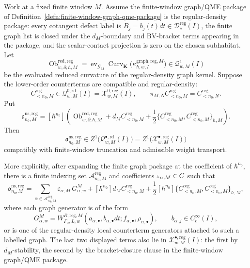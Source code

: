 \begin{prop}
\label{prop:wt-regular-density-curvature-certificate}
  Work at a fixed finite window \(M\).  Assume the finite-window
  graph/QME package of
  Definition~\ref{defn:finite-window-graph-qme-package} is the
  regular-density package: every cotangent defect label is
  \(B_j=b_j(t)dt\in\mathcal D^{\mathrm{reg}}_c(I)\), the finite graph list
  is closed under the \(d_M\)-boundary and BV-bracket terms appearing in
  the package, and the scalar-contact projection is zero on the chosen
  subhabitat.  Let
  \[
    \operatorname{Ob}^{\mathrm{red,reg}}_{w,\partial,\hbar,M}
      =
    \operatorname{ev}_{\mathcal G_M}
      \operatorname{Curv}_{\mathbf K}
      \bigl(\kappa^{\mathrm{graph,reg},M}_{\hbar,w,I}\bigr)
      \in
    \mathcal Q^1_{w,M}(I)
  \]
  be the evaluated reduced curvature of the regular-density graph kernel.
  Suppose the lower-order counterterms are compatible and regular-density:
  \[
    C^{\mathrm{reg}}_{<n_0,M}
      \in
    \mathcal Q^{0,\mathrm{rd}}_{w,M}(I)
      =
    \mathcal X^{0,\mathrm{reg}}_{w,M}(I),
    \qquad
    \pi_{M,N}C^{\mathrm{reg}}_{<n_0,M}
      =
    C^{\mathrm{reg}}_{<n_0,N}.
  \]
  Put
  \[
    \mathfrak o^{\mathrm{ns,reg}}_{n_0,M}
      =
      [\hbar^{n_0}]\left(
        \operatorname{Ob}^{\mathrm{red,reg}}_{w,\partial,\hbar,M}
        +d_MC^{\mathrm{reg}}_{<n_0,M}
        +\frac12
          \{C^{\mathrm{reg}}_{<n_0,M},
            C^{\mathrm{reg}}_{<n_0,M}\}_{\hbar,M}
      \right).
  \]
  Then
  \[
    \mathfrak o^{\mathrm{ns,reg}}_{n_0,M}
      \in
    Z^1\bigl(\mathcal Q^{\bullet,\mathrm{rd}}_{w,M}(I)\bigr)
      =
    Z^1\bigl(\mathcal X^{\bullet,\mathrm{reg}}_{w,M}(I)\bigr)
  \]
  compatibly with finite-window truncation and admissible weight transport.

  More explicitly, after expanding the finite graph package at the
  coefficient of \(\hbar^{n_0}\), there is a finite indexing set
  \(\mathcal A^{\mathrm{reg}}_{n_0,M}\) and coefficients
  \(\varepsilon_{\alpha,M}\in C\) such that
  \[
    \mathfrak o^{\mathrm{ns,reg}}_{n_0,M}
      =
    \sum_{\alpha\in\mathcal A^{\mathrm{reg}}_{n_0,M}}
      \varepsilon_{\alpha,M}\,G^M_{\alpha,w}
      +[\hbar^{n_0}]d_MC^{\mathrm{reg}}_{<n_0,M}
      +\frac12[\hbar^{n_0}]
        \{C^{\mathrm{reg}}_{<n_0,M},
          C^{\mathrm{reg}}_{<n_0,M}\}_{\hbar,M},
  \]
  where each graph generator is of the form
  \[
    G^M_{\alpha,w}
      =
    W^{R,\mathrm{reg},M}_{\Gamma_\alpha,L,w}
      (a_{\alpha,\bullet},b_{\alpha,\bullet}dt;
       f_{\alpha,\bullet},\rho_{\alpha,\bullet}),
    \qquad
    b_{\alpha,j}\in C^\infty_c(I),
  \]
  or is one of the regular-density local counterterm generators attached
  to such a labelled graph.  The last two displayed terms also lie in
  \(\mathcal X^{\bullet,\mathrm{reg}}_{w,M}(I)\): the first by
  \(d_M\)-stability, the second by the bracket-closure clause in the
  finite-window graph/QME package.


\end{prop}
